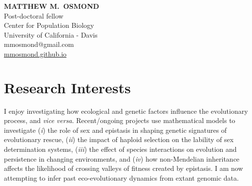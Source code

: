 \documentclass[12pt]{article}
\begin{document}
\thispagestyle{empty} 
\pagestyle{fancy}

{\raggedleft
\noindent\Large{\textbf{MATTHEW M.\ OSMOND}}\\
\large Post-doctoral fellow\\
\large Center for Population Biology\\
\large University of California - Davis \\
\large mmosmond@gmail.com\\
\href{https://mmosmond.github.io}{mmosmond.github.io}\\
}



\section*{Research Interests}

I enjoy investigating how ecological and genetic factors influence the evolutionary process, and \textit{vice versa}.
Recent/ongoing projects use mathematical models to investigate (\textit{i}) the role of sex and epistasis in shaping genetic signatures of evolutionary rescue, (\textit{ii}) the impact of haploid selection on the lability of sex determination systems, (\textit{iii}) the effect of species interactions on evolution and persistence in changing environments, and (\textit{iv}) how non-Mendelian inheritance affects the likelihood of crossing valleys of fitness created by epistasis.
I am now attempting to infer past eco-evolutionary dynamics from extant genomic data.
\end{document}
